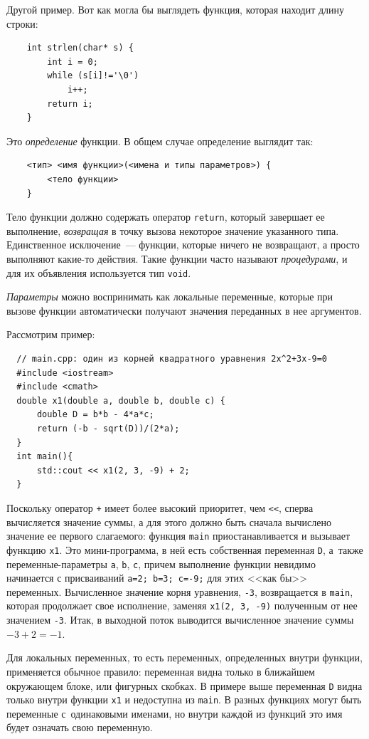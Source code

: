 \documentclass{article}
\begin{document}
Другой пример. Вот как могла бы выглядеть функция, которая находит длину строки:
\begin{verbatim}
    int strlen(char* s) {
        int i = 0;
        while (s[i]!='\0')
            i++;
        return i;
    }
\end{verbatim}
Это \emph{определение} функции. В общем случае определение выглядит так:
\begin{verbatim}
    <тип> <имя функции>(<имена и типы параметров>) {
        <тело функции>
    }
\end{verbatim}
Тело функции должно содержать оператор \texttt{return}, который завершает ее выполнение, \emph{возвращая} в точку вызова некоторое значение указанного типа. Единственное исключение~--- функции, которые ничего не возвращают, а просто выполняют какие-то действия. Такие функции часто называют \emph{процедурами}, и для их объявления используется тип \texttt{void}.

\emph{Параметры} можно воспринимать как локальные переменные, которые при вызове функции автоматически получают значения переданных в нее аргументов.

Рассмотрим пример:
\begin{verbatim}
  // main.cpp: один из корней квадратного уравнения 2x^2+3x-9=0
  #include <iostream>
  #include <cmath>
  double x1(double a, double b, double c) {
      double D = b*b - 4*a*c;
      return (-b - sqrt(D))/(2*a);
  }
  int main(){
      std::cout << x1(2, 3, -9) + 2;
  }
\end{verbatim}

Поскольку оператор \texttt{+} имеет более высокий приоритет, чем \texttt{<<}, сперва вычисляется значение суммы, а для этого должно быть сначала вычислено значение ее первого слагаемого: функция \texttt{main} приостанавливается и вызывает функцию \texttt{x1}. Это мини-программа, в ней есть собственная переменная \texttt{D}, а~также переменные-параметры \texttt{a}, \texttt{b}, \texttt{c}, причем выполнение функции невидимо начинается с присваиваний \texttt{a=2; b=3; c=-9;} для этих <<как бы>> переменных. Вычисленное значение корня уравнения, \texttt{-3}, возвращается в \texttt{main}, которая продолжает свое исполнение, заменяя \texttt{x1(2, 3, -9)} полученным от нее значением \texttt{-3}. Итак, в выходной поток выводится вычисленное значение суммы $-3 + 2 = -1$.

Для локальных переменных, то есть переменных, определенных внутри функции, применяется обычное правило: переменная видна только в ближайшем окружающем блоке, или фигурных скобках. В примере выше переменная \texttt{D} видна только внутри функции \texttt{x1} и недоступна из \texttt{main}. В разных функциях могут быть переменные с~одинаковыми именами, но внутри каждой из функций это имя будет означать свою переменную.
\end{document}
